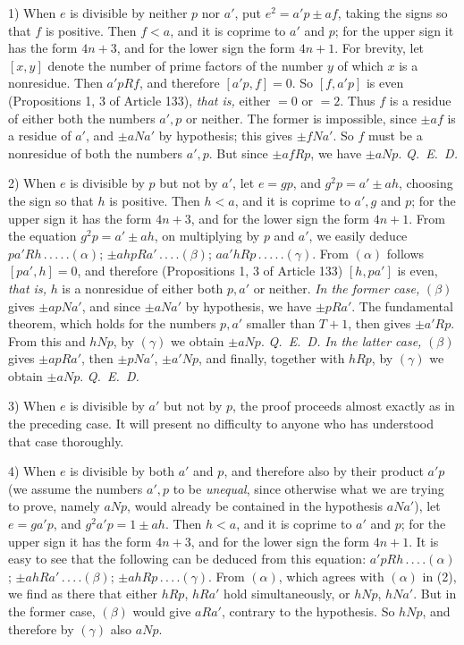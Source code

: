 1) When $e$ is divisible by neither $p$ nor $a'$, put $e^2=a'p\pm af$, taking the signs so that $f$ is positive. Then $f<a$, and it is coprime to $a'$ and $p$; for the upper sign it has the form $4n+3$, and for the lower sign the form $4n+1$. For brevity, let $[x,y]$ denote the number of prime factors of the number $y$ of which $x$ is a nonresidue. Then $a'pRf$, and therefore $[a'p,f]=0$. So $[f,a'p]$ is even (Propositions 1, 3 of Article 133), \textit{that is,} either $=0$ or $=2$. Thus $f$ is a residue of either both the numbers $a',p$ or neither. The former is impossible, since $\pm af$ is a residue of $a'$, and $\pm aNa'$ by hypothesis; this gives $\pm fNa'$. So $f$ must be a nonresidue of both the numbers $a',p$. But since $\pm afRp$, we have $\pm aNp$. \mbox{\textit{Q. E. D.}}

2) When $e$ is divisible by $p$ but not by $a'$, let $e=gp$, and $g^2p=a'\pm ah$, choosing the sign so that $h$ is positive. Then $h<a$, and it is coprime to $a',g$ and $p$; for the upper sign it has the form $4n+3$, and for the lower sign the form $4n+1$. From the equation $g^2p=a'\pm ah$, on multiplying by $p$ and $a'$, we easily deduce $pa'Rh\,.\,.\,.\,.\,.(\alpha)$; $\pm ahpRa'\,.\,.\,.\,.(\beta)$; $aa'hRp\,.\,.\,.\,.\,.(\gamma)$. From $(\alpha)$ follows $[pa',h]=0$, and therefore (Propositions 1, 3 of Article 133) $[h,pa']$ is even, \textit{that is,} $h$ is a nonresidue of either both $p,a'$ or neither. \textit{In the former case,} $(\beta)$ gives $\pm apNa'$, and since $\pm aNa'$ by hypothesis, we have $\pm pRa'$. The fundamental theorem, which holds for the numbers $p,a'$ smaller than $T+1$, then gives $\pm a'Rp$. From this and $hNp$, by $(\gamma)$ we obtain $\pm aNp$. \mbox{\textit{Q. E. D.}} \textit{In the latter case,} $(\beta)$ gives $\pm apRa'$, then $\pm pNa'$, $\pm a'Np$, and finally, together with $hRp$, by $(\gamma)$ we obtain $\pm aNp$. \mbox{\textit{Q. E. D.}}

3) When $e$ is divisible by $a'$ but not by $p$, the proof proceeds almost exactly as in the preceding case. It will present no difficulty to anyone who has understood that case thoroughly.

4) When $e$ is divisible by both $a'$ and $p$, and therefore also by their product $a'p$ (we assume the numbers $a',p$ to be \textit{unequal}, since otherwise what we are trying to prove, namely $aNp$, would already be contained in the hypothesis $aNa'$), let $e=ga'p$, and $g^2a'p=1\pm ah$. Then $h<a$, and it is coprime to $a'$ and $p$; for the upper sign it has the form $4n+3$, and for the lower sign the form $4n+1$. It is easy to see that the following can be deduced from this equation: $a'pRh\,.\,.\,.\,.(\alpha)$; $\pm ahRa'\,.\,.\,.\,.(\beta)$; $\pm ahRp\,.\,.\,.\,.(\gamma)$. From $(\alpha)$, which agrees with $(\alpha)$ in (2), we find as there that either $hRp$, $hRa'$ hold simultaneously, or $hNp$, $hNa'$. But in the former case, $(\beta)$ would give $aRa'$, contrary to the hypothesis. So $hNp$, and therefore by $(\gamma)$ also $aNp$.

